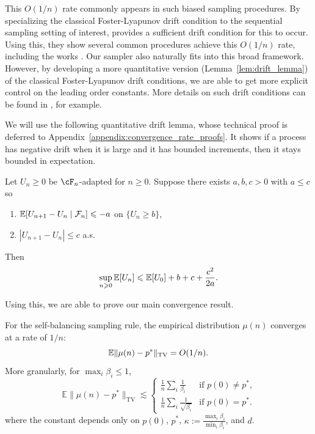  This $O(1/n)$ rate commonly appears in such biased sampling procedures. By specializing the classical
 Foster-Lyapunov drift condition to the sequential sampling setting of interest, \cite{hu2016_generalized_efron_biased_coin}
 provides a sufficient drift condition for this to occur. Using this, they show several common procedures achieve
 this $O(1/n)$ rate, including the works \cite{efron1971_forcing_sequential_experiment_balanced,pocock1975_sequential_treatment_assignment,antognini2004_adjustable_biased_coin_design}.
 Our sampler also naturally fits into this broad framework. However, by developing a more quantitative version (Lemma~\ref{lem:drift_lemma}) of
 the classical Foster-Lyapunov drift conditions, we are able to get more explicit control on the leading order constants. More details
 on such drift conditions can be found in \cite{meyn2009_markov_chains_stochastic_stability}, for example.

We will use the following quantitative drift lemma, whose technical proof is deferred to 
Appendix~\ref{appendix:convergence_rate_proofs}. It shows if a process has negative drift when it is
large and it has bounded increments, then it stays bounded in expectation.

\begin{lemma} \label{lem:drift_lemma}
    Let $U_n \geq 0$ be $\cF_n$-adapted for $n \geq 0$. Suppose there exists $a,b,c > 0$ with $a \leq c$ so
    \begin{enumerate}
        \item[(i)] $\mathbb{E}[U_{n+1} - U_n \mid \mathcal F_n] \leqslant - a$ on $\{U_n \geq b\}$,
        \item[(ii)] $|U_{n+1} - U_n| \leq c$ a.s.
    \end{enumerate}
    Then
    $$\sup_{n \geqslant 0} \mathbb{E}[U_n] \leqslant \mathbb{E}[U_0] + b + c + \frac{c^2}{2a}.$$
\end{lemma}

\noindent Using this, we are able to prove our main convergence result.

\begin{theorem} \label{thm:average_case_conv_rate}
    For the self-balancing sampling rule, the empirical distribution $\mu(n)$ converges at a rate of $1/n$:
    $$\mathbb{E}\| \mu(n) - p^* \|_{\operatorname{TV}} = O(1/n).$$
    More granularly, for $\max_i \beta_i \leq 1$,
    $$\mathbb E \| \mu(n) - p^*\|_{\operatorname{TV}} \lesssim \begin{cases}
        \frac{1}{n}\sum_i \frac{1}{\beta_i} & \text{if $p(0) \neq p^*$,} \\
        \frac{1}{n}\sum_i \frac{1}{ \sqrt{\beta_i}} & \text{if $p(0) = p^*$.}
    \end{cases}$$
    where the constant depends only on $p(0)$, $p^*$, $\kappa := \frac{\max_i \beta_i}{\min_i \beta_i}$, and $d$.
\end{theorem}


